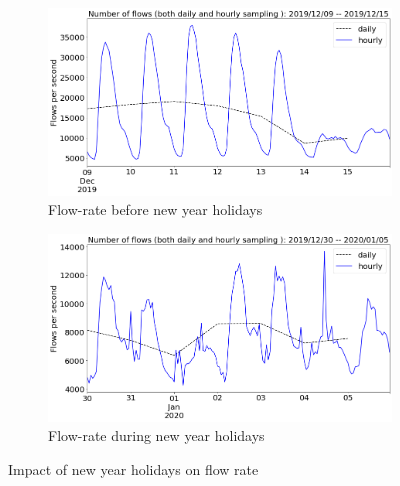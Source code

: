 \documentclass[10pt, journal, letterpaper]{IEEEtran}
\newcommand\linearFigSze{0.48}
\begin{document}
\begin{figure}
    \begin{subfigure}{\linearFigSze\textwidth}
          \centering
          \includegraphics[width=\columnwidth]{img/BCH2_flowrate.png}
          \caption{Flow-rate before new year holidays}
          \label{fig:BCH2_fps}
    \end{subfigure}
    \begin{subfigure}{\linearFigSze\textwidth}
          \centering
          \includegraphics[width=\columnwidth]{img/CH2_flowrate.png}
          \caption{Flow-rate during new year holidays}
          \label{fig:CH2_fps}
    \end{subfigure}
    \caption{Impact of new year holidays on flow rate}
    \label{fig:flowrate_BCH_CH}
\end{figure}
\end{document}
